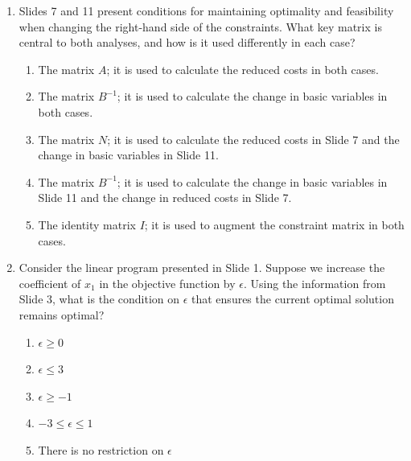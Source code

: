 \documentclass{article}%
\begin{document}
\begin{enumerate}
\begin{enumerate}
\item The primal simplex method is used to re-optimize the problem.%
\item Linear programming duality is used to find the optimal solution.%
\end{enumerate}%
\vspace{1em}%
\item Slides 7 and 11 present conditions for maintaining optimality and feasibility when changing the right-hand side of the constraints. What key matrix is central to both analyses, and how is it used differently in each case?%
\begin{enumerate}%
\item The matrix $A$; it is used to calculate the reduced costs in both cases.%
\item The matrix $B^{-1}$; it is used to calculate the change in basic variables in both cases.%
\item The matrix $N$; it is used to calculate the reduced costs in Slide 7 and the change in basic variables in Slide 11.%
\item The matrix $B^{-1}$; it is used to calculate the change in basic variables in Slide 11 and the change in reduced costs in Slide 7.%
\item The identity matrix $I$; it is used to augment the constraint matrix in both cases.%
\end{enumerate}%
\vspace{1em}%
\item Consider the linear program presented in Slide 1. Suppose we increase the coefficient of $x_1$ in the objective function by $\epsilon$. Using the information from Slide 3, what is the condition on $\epsilon$ that ensures the current optimal solution remains optimal?%
\begin{enumerate}%
\item $\epsilon \ge 0$%
\item $\epsilon \le 3$%
\item $\epsilon \ge -1$%
\item $-3 \le \epsilon \le 1$%
\item There is no restriction on $\epsilon$%
\end{enumerate}%
\vspace{1em}%
\end{enumerate}

%
\newpage%
\end{document}
